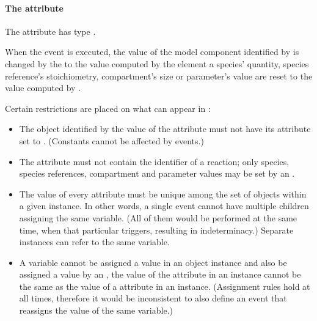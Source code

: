 \paragraph{The  attribute}

The  attribute  has type . 

When the event is executed, the value of
the model component identified by  is changed by
the \EventAssignment to the value computed by the 
element a species' quantity, species reference's
stoichiometry, compartment's size or parameter's value are reset
to the value computed by .

Certain restrictions are placed on what can appear in
:
\begin{itemize}
  
\item The object identified by the value of the 
  attribute must not have its  attribute set 
  to .  (Constants cannot be affected by events.)
  
\item The  attribute must not contain the
  identifier of a reaction;  only species, species references,
  compartment and parameter values may be set by an \Event.
  
\item The value of every  attribute must be unique
  among the set of \EventAssignment objects within a given
  \Event instance.  In other words, a single event cannot have
  multiple \EventAssignment children assigning the same variable.  (All
  of them would be performed at the same time, when that
  particular \Event triggers, resulting in indeterminacy.)
  Separate \Event instances can refer to the same variable.
  
\item A variable cannot be assigned a value in an \EventAssignment
  object instance and also be assigned a value by an
  \AssignmentRule, \ie the value of the  attribute
  in an \EventAssignment instance cannot be the same as the value
  of a  attribute in an \AssignmentRule instance.
  (Assignment rules hold at all times, therefore it would be
  inconsistent to also define an event that reassigns the value of
  the same variable.)

\end{itemize}

